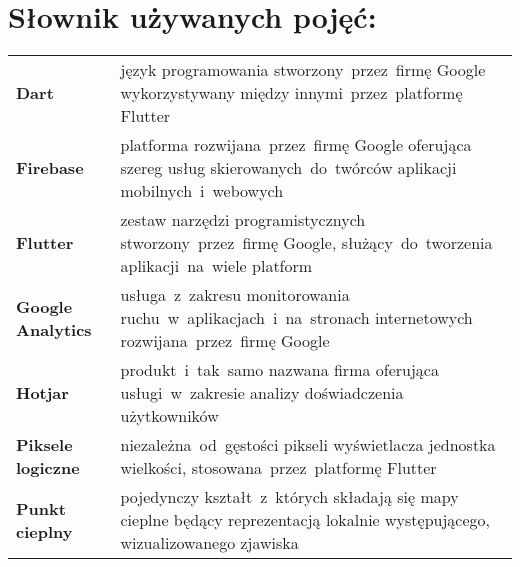 \section*{Słownik używanych pojęć:}

\begin{table}[H]
\begin{tabularx}{\textwidth}{ m{2.8cm} X }
	\textbf{Dart} \dotfill & język programowania stworzony~przez~firmę Google wykorzystywany między innymi~przez~platformę Flutter \\
	\textbf{Firebase} \dotfill & platforma rozwijana~przez~firmę Google oferująca szereg usług skierowanych~do~twórców aplikacji mobilnych~i~webowych \\
	\textbf{Flutter} \dotfill & zestaw narzędzi programistycznych stworzony~przez~firmę Google, służący~do~tworzenia aplikacji~na~wiele platform \\
	\textbf{Google Analytics} \dotfill & usługa~z~zakresu monitorowania ruchu~w~aplikacjach~i~na~stronach internetowych rozwijana~przez~firmę Google \\
	\textbf{Hotjar} \dotfill & produkt~i~tak~samo nazwana firma oferująca usługi~w~zakresie analizy doświadczenia użytkowników \\
	\textbf{Piksele logiczne} \dotfill & niezależna~od~gęstości pikseli wyświetlacza jednostka wielkości, stosowana~przez~platformę Flutter \\
	\textbf{Punkt cieplny} \dotfill & pojedynczy kształt~z~których składają się mapy cieplne będący reprezentacją lokalnie występującego, wizualizowanego zjawiska \\
\end{tabularx}
\end{table}
